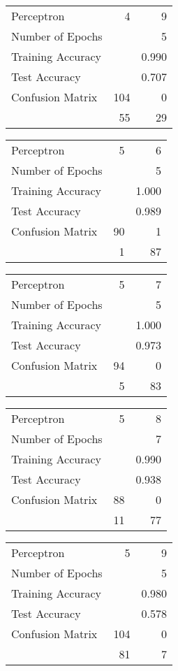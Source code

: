 \documentclass[11pt]{article}
\begin{document}
\begin{minipage}[t]{0.5\textwidth}
\begin{tabular}{|l | r r|}
\hline Perceptron & 4 & 9\\
Number of Epochs & & 5\\
Training Accuracy & & 0.990\\
Test Accuracy & & 0.707\\
Confusion Matrix & 104 & 0\\
 &55 & 29\\ \hline
\end{tabular}
\end{minipage}
\begin{minipage}[t]{0.5\textwidth}
\begin{tabular}{|l | r r|}
\hline Perceptron & 5 & 6\\
Number of Epochs & & 5\\
Training Accuracy & & 1.000\\
Test Accuracy & & 0.989\\
Confusion Matrix & 90 & 1\\
 &1 & 87\\ \hline
\end{tabular}
\end{minipage}
\begin{minipage}[t]{0.5\textwidth}
\begin{tabular}{|l | r r|}
\hline Perceptron & 5 & 7\\
Number of Epochs & & 5\\
Training Accuracy & & 1.000\\
Test Accuracy & & 0.973\\
Confusion Matrix & 94 & 0\\
 &5 & 83\\ \hline
\end{tabular}
\end{minipage}
\begin{minipage}[t]{0.5\textwidth}
\begin{tabular}{|l | r r|}
\hline Perceptron & 5 & 8\\
Number of Epochs & & 7\\
Training Accuracy & & 0.990\\
Test Accuracy & & 0.938\\
Confusion Matrix & 88 & 0\\
 &11 & 77\\ \hline
\end{tabular}
\end{minipage}
\begin{minipage}[t]{0.5\textwidth}
\begin{tabular}{|l | r r|}
\hline Perceptron & 5 & 9\\
Number of Epochs & & 5\\
Training Accuracy & & 0.980\\
Test Accuracy & & 0.578\\
Confusion Matrix & 104 & 0\\
 &81 & 7\\ \hline
\end{tabular}
\end{minipage}
\end{document}
